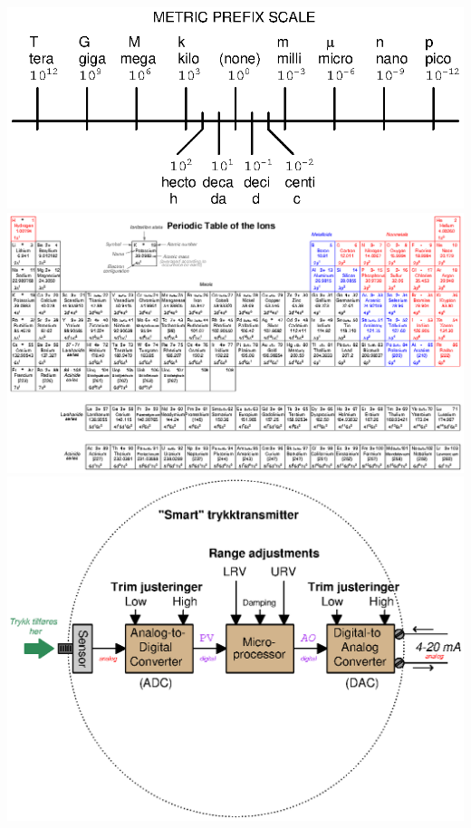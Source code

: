 	
\newpage
\includegraphics[width=1\textwidth]{002.eps}
\vfil \eject
\includegraphics[angle=90,height=1\textheight]{./chemistry12.eps}
\vfil \eject
\includegraphics[width=1\textwidth]{calibrate03.eps}
